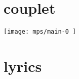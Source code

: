\documentclass[11pt]{article}
\begin{document}
    \makesongtitle
\section*{couplet}
      \texttt{[image:  mps/main-0 ]}

\newpage


\section*{lyrics}
\begin{multicols}{2}

\end{multicols}
\end{document}
